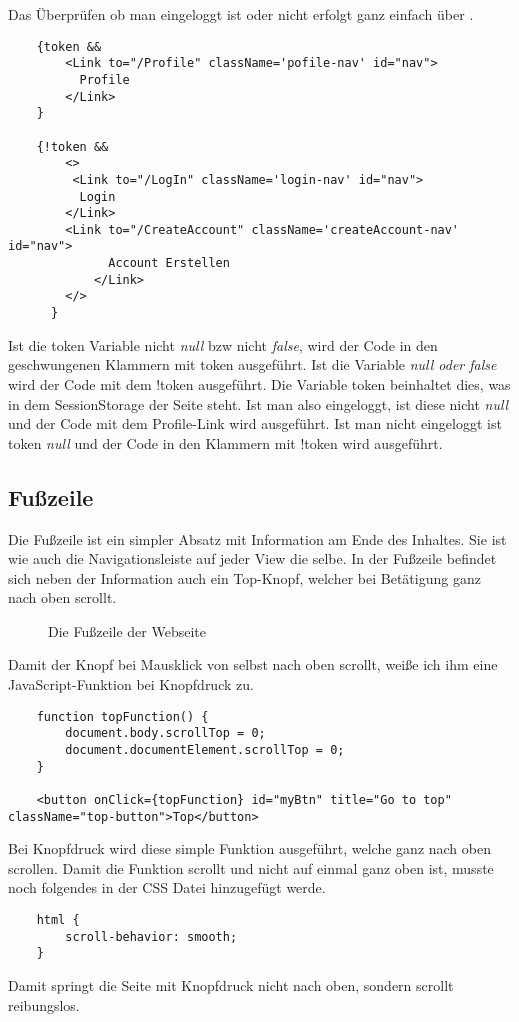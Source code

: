 Das Überprüfen ob man eingeloggt ist oder nicht erfolgt ganz einfach über .


\begin{lstlisting}
    {token && 
        <Link to="/Profile" className='pofile-nav' id="nav">
          Profile
        </Link>
    }

    {!token &&
        <>
         <Link to="/LogIn" className='login-nav' id="nav">
          Login
        </Link>
        <Link to="/CreateAccount" className='createAccount-nav' id="nav">
              Account Erstellen
            </Link>
        </>
      }
\end{lstlisting}

Ist die token Variable nicht \textit{null} bzw nicht \textit{false}, wird der Code in den geschwungenen Klammern 
mit token ausgeführt. Ist die Variable \textit{null oder false} wird der Code mit dem !token ausgeführt. 
Die Variable token beinhaltet dies, was in dem SessionStorage der Seite steht. Ist man also eingeloggt, ist diese 
nicht \textit{null} und der Code mit dem Profile-Link wird ausgeführt. Ist man nicht eingeloggt ist token 
\textit{null} und der Code in den Klammern mit !token wird ausgeführt.

\subsection{Fußzeile}
\label{footer}

Die Fußzeile ist ein simpler Absatz mit Information am Ende des Inhaltes.
Sie ist wie auch die Navigationsleiste auf jeder View die selbe. In der Fußzeile befindet sich neben 
der Information auch ein Top-Knopf, welcher bei Betätigung ganz nach oben scrollt. 

\begin{figure}[H]
    \begin{center}
      \caption{Die Fußzeile der Webseite}
    \end{center}
\end{figure}

\pagebreak

Damit der Knopf bei Mausklick von selbst nach oben scrollt, weiße ich ihm eine JavaScript-Funktion bei
Knopfdruck zu.

\begin{lstlisting}
    function topFunction() {
        document.body.scrollTop = 0;
        document.documentElement.scrollTop = 0;
    }

    <button onClick={topFunction} id="myBtn" title="Go to top" className="top-button">Top</button>
\end{lstlisting}

Bei Knopfdruck wird diese simple Funktion ausgeführt, welche ganz nach oben scrollen. Damit die 
Funktion scrollt und nicht auf einmal ganz oben ist, musste noch folgendes in der CSS Datei 
hinzugefügt werde.

\begin{lstlisting}
    html {
        scroll-behavior: smooth;
    }
\end{lstlisting}

Damit springt die Seite mit Knopfdruck nicht nach oben, sondern scrollt reibungslos.